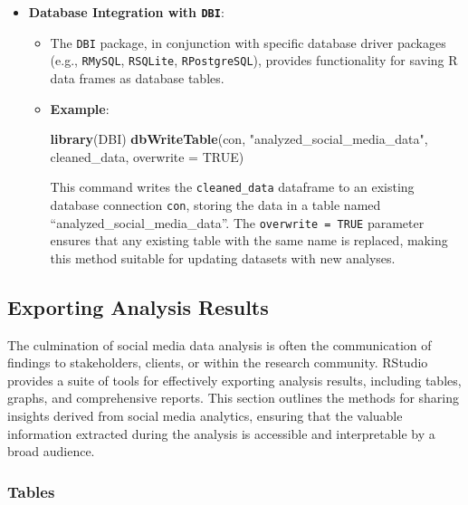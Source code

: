 \documentclass[
]{book}
\newenvironment{Shaded}{\begin{snugshade}}{\end{snugshade}}
\newcommand{\AttributeTok}[1]{\textcolor[rgb]{0.13,0.29,0.53}{#1}}
\newcommand{\ConstantTok}[1]{\textcolor[rgb]{0.56,0.35,0.01}{#1}}
\newcommand{\FunctionTok}[1]{\textcolor[rgb]{0.13,0.29,0.53}{\textbf{#1}}}
\newcommand{\NormalTok}[1]{#1}
\newcommand{\StringTok}[1]{\textcolor[rgb]{0.31,0.60,0.02}{#1}}
\providecommand{\tightlist}{%
  \setlength{\itemsep}{0pt}\setlength{\parskip}{0pt}}
\begin{document}
\begin{itemize}
\tightlist
\item
  \textbf{Database Integration with \texttt{DBI}}:

  \begin{itemize}
  \item
    The \texttt{DBI} package, in conjunction with specific database driver packages (e.g., \texttt{RMySQL}, \texttt{RSQLite}, \texttt{RPostgreSQL}), provides functionality for saving R data frames as database tables.
  \item
    \textbf{Example}:

\begin{Shaded}
\begin{Highlighting}[]
\FunctionTok{library}\NormalTok{(DBI)}
\FunctionTok{dbWriteTable}\NormalTok{(con, }\StringTok{"analyzed\_social\_media\_data"}\NormalTok{, cleaned\_data, }\AttributeTok{overwrite =} \ConstantTok{TRUE}\NormalTok{)}
\end{Highlighting}
\end{Shaded}

    This command writes the \texttt{cleaned\_data} dataframe to an existing database connection \texttt{con}, storing the data in a table named ``analyzed\_social\_media\_data''. The \texttt{overwrite\ =\ TRUE} parameter ensures that any existing table with the same name is replaced, making this method suitable for updating datasets with new analyses.
  \end{itemize}
\end{itemize}

\hypertarget{exporting-analysis-results}{%
\subsection{Exporting Analysis Results}\label{exporting-analysis-results}}

The culmination of social media data analysis is often the communication of findings to stakeholders, clients, or within the research community. RStudio provides a suite of tools for effectively exporting analysis results, including tables, graphs, and comprehensive reports. This section outlines the methods for sharing insights derived from social media analytics, ensuring that the valuable information extracted during the analysis is accessible and interpretable by a broad audience.

\hypertarget{tables}{%
\subsubsection{Tables}\label{tables}}
\end{document}
